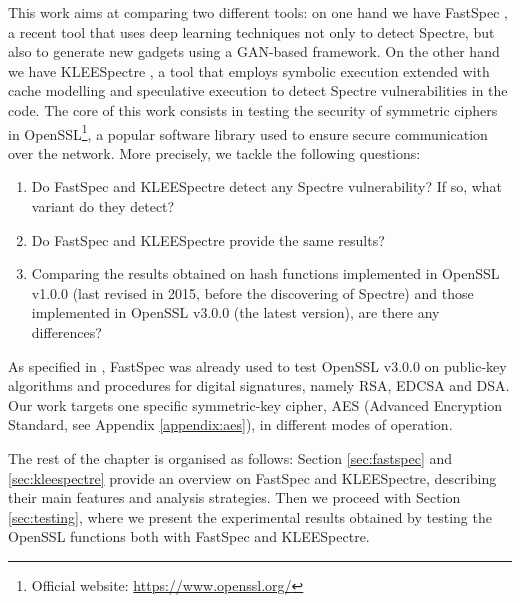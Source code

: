 \documentclass[12pt,a4paper]{book}
\theoremstyle{definition}
\begin{document}
	This work aims at comparing two different tools: on one hand we have FastSpec \cite{Tol2021}, a recent tool that uses deep learning techniques not only to detect Spectre, but also to generate new gadgets using a GAN-based framework. On the other hand we have KLEESpectre \cite{Wang2020}, a tool that employs symbolic execution extended with cache modelling and speculative execution to detect Spectre vulnerabilities in the code. The core of this work consists in testing the security of symmetric ciphers in OpenSSL\footnote{Official website: \url{https://www.openssl.org/}}, a popular software library used to ensure secure communication over the network. 
	More precisely, we tackle the following questions: 
	\begin{enumerate}
		\item Do FastSpec and KLEESpectre detect any Spectre vulnerability? If so, what variant do they detect?
		\item Do FastSpec and KLEESpectre provide the same results?
		\item Comparing the results obtained on hash functions implemented in OpenSSL v1.0.0 (last revised in 2015, before the discovering of Spectre) and those implemented in OpenSSL v3.0.0 (the latest version), are there any differences? 
	\end{enumerate}
	As specified in \cite{Tol2021}, FastSpec was already used to test OpenSSL v3.0.0 on public-key algorithms and procedures for digital signatures, namely RSA, EDCSA and DSA. Our work targets one specific symmetric-key cipher, AES (Advanced Encryption Standard, see Appendix \ref{appendix:aes}), in different modes of operation. 
	
	The rest of the chapter is organised as follows: Section \ref{sec:fastspec} and \ref{sec:kleespectre} provide an overview on FastSpec and KLEESpectre, describing their main features and analysis strategies. Then we proceed with Section \ref{sec:testing}, where we present the experimental results obtained by testing the OpenSSL functions both with FastSpec and KLEESpectre. 
\end{document}
